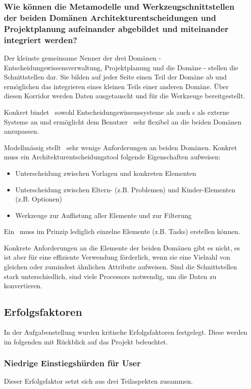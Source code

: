 		
		\subsubsection{Wie können die Metamodelle und Werkzeugschnittstellen der beiden Domänen Architekturentscheidungen und Projektplanung aufeinander abgebildet und miteinander integriert werden?}
			Der kleinste gemeinsame Nenner der drei Domänen - Entscheidungswissensverwaltung, Projektplanung und die \eeppi\-Domäne - stellen die Schnittstellen dar.
			Sie bilden auf jeder Seite einen Teil der Domäne ab und ermöglichen das integrieren eines kleinen Teils einer anderen Domäne. 
			Über diesen Korridor werden Daten ausgetauscht und für die Werkzeuge bereitgestellt.
		
			Konkret bindet \eeppi\ sowohl Entscheidungswissenssysteme als auch \ppt s als externe Systeme an
			und ermöglicht dem Benutzer \eeppi\ sehr flexibel an die beiden Domänen anzupassen.
			
			Modellmässig stellt \eeppi\ sehr wenige Anforderungen an beiden Domänen.
			Konkret muss ein Architekturentscheidungstool folgende Eigenschaften aufweisen:
			\begin{itemize}
				\item{Unterscheidung zwischen Vorlagen und konkreten Elementen}
				\item{Unterscheidung zwischen Eltern- (z.B. Problemen) und Kinder-Elementen (z.B. Optionen)}
				\item{Werkzeuge zur Auflistung aller Elemente und zur Filterung}
			\end{itemize}
			
			Ein \ppt\ muss im Prinzip lediglich einzelne Elemente (z.B. Tasks) erstellen können.
			
			Konkrete Anforderungen an die Elemente der beiden Domänen gibt es nicht,
			es ist aber für eine effiziente Verwendung förderlich,
			wenn sie eine Vielzahl von gleichen oder zumindest ähnlichen Attribute aufweisen.
			Sind die Schnittstellen stark unterschiedlich, sind viele Processors notwendig, um die Daten zu konvertieren.
			

	\subsection{Erfolgsfaktoren}
		In der Aufgabenstellung wurden kritische Erfolgsfaktoren festgelegt.
		Diese werden im folgenden mit Rückblick auf das Projekt beleuchtet.
		
		
		\subsubsection{Niedrige Einstiegshürden für User}
			Dieser Erfolgsfaktor setzt sich aus drei Teilaspekten zusammen.
			
